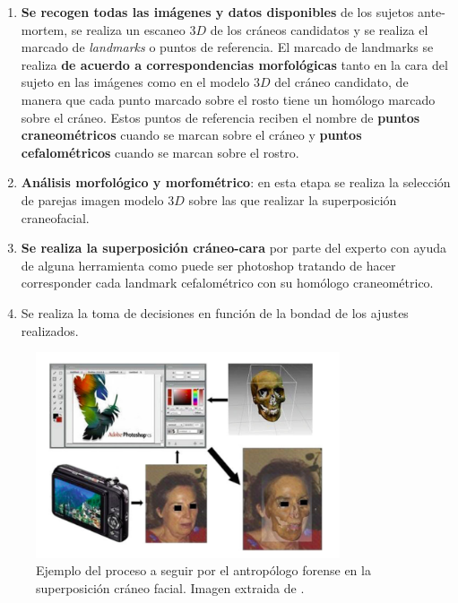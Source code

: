 \begin{enumerate}
    \item \textbf{Se recogen todas las imágenes y datos disponibles} de los sujetos ante-mortem, se realiza un escaneo $3D$ de los cráneos candidatos y se realiza el marcado de \textit{landmarks} o puntos de referencia. El marcado de landmarks se realiza \textbf{de acuerdo a correspondencias morfológicas} tanto en la cara del sujeto en las imágenes como en el modelo $3D$ del cráneo candidato, de manera que cada punto marcado sobre el rosto tiene un homólogo marcado sobre el cráneo. Estos puntos de referencia reciben el nombre de \textbf{puntos craneométricos} cuando se marcan sobre el cráneo y \textbf{puntos cefalométricos} cuando se marcan sobre el rostro.
    \item \textbf{Análisis morfológico y morfométrico}: en esta etapa se realiza la selección de parejas imagen modelo $3D$ sobre las que realizar la superposición craneofacial.
    \item \textbf{Se realiza la superposición cráneo-cara} por parte del experto con ayuda de alguna herramienta como puede ser photoshop tratando de hacer corresponder cada landmark cefalométrico con su homólogo craneométrico.
    \item Se realiza la toma de decisiones en función de la bondad de los ajustes realizados.
\end{enumerate}

\begin{figure}[!h]
    \centering
    \includegraphics[width=0.8\textwidth]{img/ejemplo_SCF_intro.png}
    \caption{Ejemplo del proceso a seguir por el antropólogo forense en la superposición cráneo facial. Imagen extraida de \cite{damas2020handbook}.}
\end{figure}

\medskip

